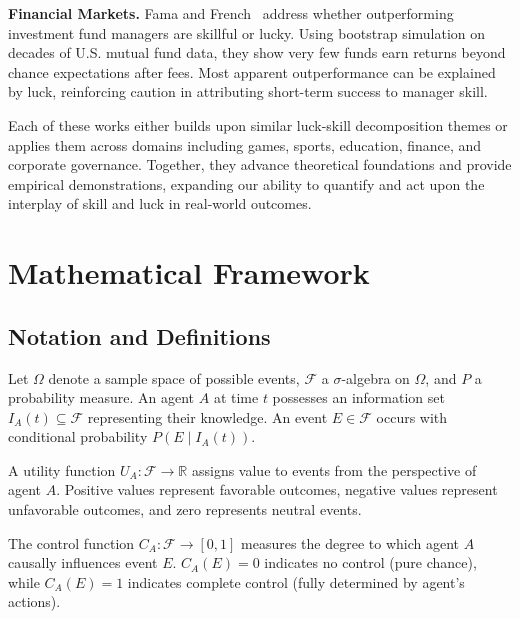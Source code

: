   \textbf{Financial Markets.}
  Fama and French~\cite{fama2010} address whether outperforming investment
  fund managers are skillful or lucky. Using bootstrap simulation on decades
  of U.S. mutual fund data, they show very few funds earn returns beyond
  chance expectations after fees. Most apparent outperformance can be explained
  by luck, reinforcing caution in attributing short-term success to manager
  skill.

  Each of these works either builds upon similar luck-skill decomposition
  themes or applies them across domains including games, sports, education,
  finance, and corporate governance. Together, they advance theoretical
  foundations and provide empirical demonstrations, expanding our ability
  to quantify and act upon the interplay of skill and luck in real-world
  outcomes.

  \section{Mathematical Framework}
  \label{sec:theory}

  \subsection{Notation and Definitions}

  Let $\Omega$ denote a sample space of possible events, $\mathcal{F}$ a
  $\sigma$-algebra on $\Omega$, and $P$ a probability measure. An agent
  $A$ at time $t$ possesses an information set
  $I_{A}(t) \subseteq \mathcal{F}$ representing their knowledge. An event
  $E \in \mathcal{F}$ occurs with conditional probability $P(E \mid I_{A}
  (t))$.

  \begin{definition}
    A utility function $U_{A}: \mathcal{F}\to \mathbb{R}$ assigns value to
    events from the perspective of agent $A$. Positive values represent
    favorable outcomes, negative values represent unfavorable outcomes,
    and zero represents neutral events.
  \end{definition}

  \begin{definition}[Control]
    The control function $C_{A}: \mathcal{F}\to [0,1]$ measures the degree
    to which agent $A$ causally influences event $E$. $C_{A}(E) = 0$
    indicates no control (pure chance), while $C_{A}(E) = 1$ indicates complete
    control (fully determined by agent's actions).
  \end{definition}

